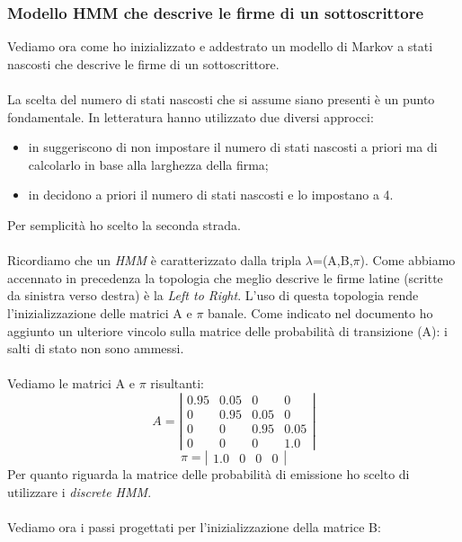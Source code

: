 \subsubsection*{Modello HMM che descrive le firme di un sottoscrittore}
\label{3.3.3.4}
Vediamo ora come ho inizializzato e addestrato un modello di Markov a stati nascosti che descrive le firme di un sottoscrittore.\\\\
La scelta del numero di stati nascosti che si assume siano presenti è un punto fondamentale. In letteratura hanno utilizzato due diversi approcci:
\begin{itemize}
\item in \cite{3} suggeriscono di non impostare il numero di stati nascosti a priori ma di calcolarlo in base alla larghezza della firma;
\item in \cite{5} decidono a priori il numero di stati nascosti e lo impostano a 4.
\end{itemize}
Per semplicità ho scelto la seconda strada.\\\\
Ricordiamo che un \emph{HMM} è caratterizzato dalla tripla $\lambda$=(A,B,$\pi$). Come abbiamo accennato in precedenza la topologia che meglio descrive le firme latine (scritte da sinistra verso destra) è la \emph{Left to Right}. L'uso di questa topologia rende l'inizializzazione delle matrici A e $\pi$ banale. Come indicato nel documento \cite{3} ho aggiunto un ulteriore vincolo sulla matrice delle probabilità di transizione (A): i salti di stato non sono ammessi.\\\\
Vediamo le matrici A e $\pi$ risultanti:
\[A=\left| \begin{array}{cccc}
0.95&0.05&0&0 \\
0&0.95&0.05&0 \\
0&0&0.95&0.05 \\
0&0&0&1.0 \end{array} \right|\]
\[\pi=\left| \begin{array}{cccc}
1.0&0&0&0 \end{array} \right|\]
Per quanto riguarda la matrice delle probabilità di emissione ho scelto di utilizzare i \emph{discrete HMM}.\\\\
Vediamo ora i passi progettati per l'inizializzazione della matrice B:
